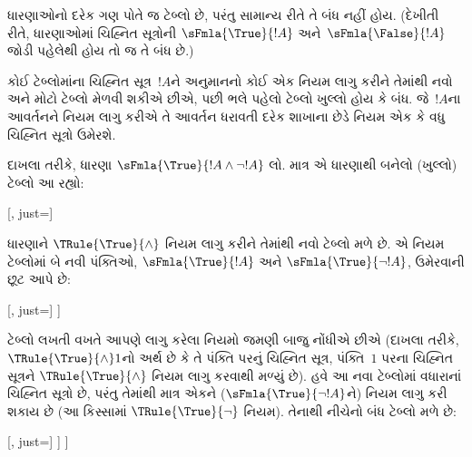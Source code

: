 \begin{ex}
  ધારણાઓનો દરેક ગણ પોતે જ ટેબ્લો છે, પરંતુ સામાન્ય રીતે તે બંધ
  નહીં હોય. (દેખીતી રીતે, ધારણાઓમાં ચિહ્નિત સૂત્રોની
  $\sFmla{\True}{!A}$ અને~$\sFmla{\False}{!A}$ જોડી પહેલેથી હોય તો જ
  તે બંધ છે.)

  કોઈ ટેબ્લોમાંના ચિહ્નિત સૂત્ર~$!A$ને અનુમાનનો કોઈ એક
  નિયમ લાગુ કરીને તેમાંથી નવો અને મોટો ટેબ્લો મેળવી શકીએ છીએ, પછી ભલે
  પહેલો ટેબ્લો ખુલ્લો હોય કે બંધ. જે~$!A$ના આવર્તનને નિયમ લાગુ કરીએ તે
  આવર્તન ધરાવતી દરેક શાખાના છેડે નિયમ એક કે વધુ ચિહ્નિત સૂત્રો
  ઉમેરશે.

  દાખલા તરીકે, ધારણા $\sFmla{\True}{!A \land \lnot !A}$ લો. માત્ર એ
  ધારણાથી બનેલો (ખુલ્લો) ટેબ્લો આ રહ્યો:
  \begin{center}
    \begin{tableau}{}
      [, just=\TAss]
    \end{tableau}{}
  \end{center}
  ધારણાને $\TRule{\True}{\land}$ નિયમ લાગુ કરીને તેમાંથી નવો
  ટેબ્લો મળે છે. એ નિયમ ટેબ્લોમાં બે નવી પંક્તિઓ,
  $\sFmla{\True}{!A}$ અને $\sFmla{\True}{\lnot !A}$, ઉમેરવાની છૂટ આપે છે:
  \begin{center}
    \begin{tableau}{}
      [, just=\TAss
        [\sFmla{\True}{\formula{A}}, just={\TRule{\True}{\land}[1]},
          [\sFmla{\True}{\lnot \formula{A}}, just={\TRule{\True}{\land}[1]}
          ]
        ]
      ]
    \end{tableau}{}
  \end{center}
  ટેબ્લો લખતી વખતે આપણે લાગુ કરેલા નિયમો જમણી બાજુ નોંધીએ છીએ
  (દાખલા તરીકે, $\TRule{\True}{\land} 1$નો અર્થ છે કે તે પંક્તિ પરનું
  ચિહ્નિત સૂત્ર, પંક્તિ~$1$ પરના ચિહ્નિત સૂત્રને
  $\TRule{\True}{\land}$ નિયમ લાગુ કરવાથી મળ્યું છે). હવે આ નવા
  ટેબ્લોમાં વધારાનાં ચિહ્નિત સૂત્રો છે, પરંતુ તેમાંથી માત્ર
  એકને ($\sFmla{\True}{\lnot !A}$ને) નિયમ લાગુ કરી શકાય છે (આ કિસ્સામાં
  $\TRule{\True}{\lnot}$ નિયમ). તેનાથી નીચેનો બંધ ટેબ્લો મળે છે:
  \begin{center}
    \begin{tableau}{}
      [, just=\TAss
        [\sFmla{\True}{\formula{A}}, just={\TRule{\True}{\land}[1]}
          [\sFmla{\True}{\lnot \formula{A}}, just={\TRule{\True}{\land}[1]}
            [\sFmla{\False}{\formula{A}}, just={\TRule{\True}{\lnot}[3]}, close]
          ]
        ]
      ]
    \end{tableau}{}
  \end{center}
\end{ex}
\endgroup


